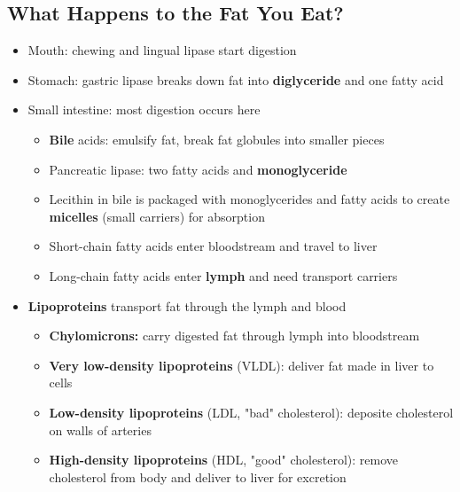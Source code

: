 \documentclass[12pt]{article}
\begin{document}
        \subsection{What Happens to the Fat You Eat?}
            \begin{itemize}
                \item Mouth: chewing and lingual lipase start digestion
                \item Stomach: gastric lipase breaks down fat into \textbf{diglyceride} and one fatty acid
                \item Small intestine: most digestion occurs here
                    \begin{itemize}
                        \item \textbf{Bile} acids: emulsify fat, break fat globules into smaller pieces
                        \item Pancreatic lipase: two fatty acids and \textbf{monoglyceride}
                        \item Lecithin in bile is packaged with monoglycerides and fatty acids to create \textbf{micelles} (small carriers) for absorption
                        \item Short-chain fatty acids enter bloodstream and travel to liver
                        \item Long-chain fatty acids enter \textbf{lymph} and need transport carriers
                    \end{itemize}
                \item \textbf{Lipoproteins} transport fat through the lymph and blood
                    \begin{itemize}
                        \item \textbf{Chylomicrons:} carry digested fat through lymph into bloodstream
                        \item \textbf{Very low-density lipoproteins} (VLDL): deliver fat made in liver to cells
                        \item \textbf{Low-density lipoproteins} (LDL, "bad" cholesterol): deposite cholesterol on walls of arteries
                        \item \textbf{High-density lipoproteins} (HDL, "good" cholesterol): remove cholesterol from body and deliver to liver for excretion
                    \end{itemize}
            \end{itemize}
\end{document}
